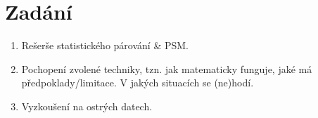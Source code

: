 \section{Zadání}

\begin{enumerate}
    \item Rešerše statistického párování \& PSM.
    \item Pochopení zvolené techniky, tzn. jak matematicky funguje, jaké má předpoklady/limitace. V jakých situacích se (ne)hodí.
    \item Vyzkoušení na ostrých datech.
\end{enumerate}
